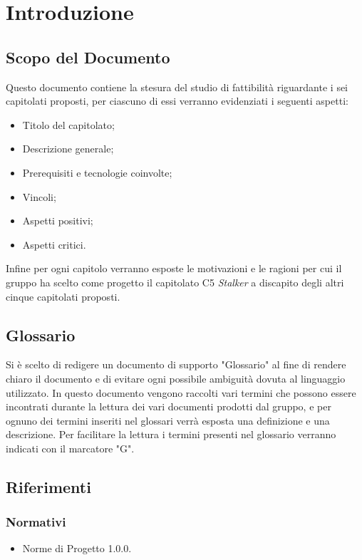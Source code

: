 \section{Introduzione}
\subsection{Scopo del Documento}
Questo documento contiene la stesura del studio di fattibilità riguardante i sei capitolati proposti, per ciascuno di essi verranno evidenziati i seguenti aspetti:
\begin{itemize}
\item Titolo del capitolato;
\item Descrizione generale;
\item Prerequisiti e tecnologie coinvolte;
\item Vincoli;
\item Aspetti positivi;
\item Aspetti critici.
\end{itemize}
Infine per ogni capitolo verranno esposte le motivazioni e le ragioni per cui il gruppo ha scelto come progetto il capitolato C5 \textit{Stalker} a discapito degli altri cinque capitolati proposti.

\subsection{Glossario}
Si è scelto di redigere un documento di supporto "Glossario" al fine di rendere chiaro il documento e di evitare ogni possibile ambiguità dovuta al linguaggio utilizzato. In questo documento vengono raccolti vari termini che possono essere incontrati durante la lettura dei vari documenti prodotti dal gruppo, e per ognuno dei termini inseriti nel glossari  verrà esposta una definizione e una descrizione. Per facilitare la lettura i termini presenti nel glossario verranno indicati con il marcatore "G".
	
\subsection{Riferimenti}

\subsubsection{Normativi}
\begin{itemize}
\item Norme di Progetto 1.0.0.
\end{itemize}

